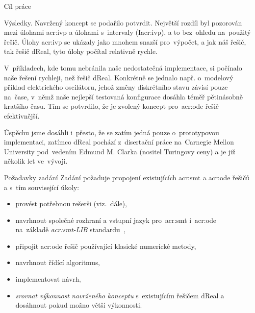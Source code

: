 \documentclass[thesis=M,czech]{FITthesis}[2012/06/26]
\newcommand{\acrlabel}[1]{acr:#1}
\newcommand{\acr}[1]{\acrshort{\acrlabel{#1}}}
\newcommand{\hl}[1]{\textit{#1}}
\newcommand{\name}[1]{\hl{#1}}
\newcommand{\cit}[1]{\cite{#1}}
\begin{document}
\begin{introduction}
\begin{section}{Cíl práce}

\begin{paragraph}{Výsledky.}\label{p:intro:goal:results}
Navržený koncept se podařilo potvrdit.
Největší rozdíl byl pozorován
mezi úlohami \acr{ivp} a úlohami s~intervaly
(I\acr{ivp}), a to bez~ohledu
na~použitý řešič.
Úlohy \acr{ivp} se ukázaly jako mnohem
snazší pro~výpočet,
a jak náš řešič, tak řešič dReal,
tyto úlohy počítal relativně rychle.

V~příkladech, kde tomu nebránila
naše nedostatečná implementace,
si počínalo naše řešení rychleji, než řešič dReal.
Konkrétně se jednalo např. o~modelový příklad
elektrického oscilátoru, jehož změny diskrétního stavu
závisí pouze na~čase,
v~němž naše nejlepší testovaná konfigurace
dosáhla téměř pětinásobně kratšího času.
Tím se potvrdilo,
že je zvolený koncept pro~\acr{ode} řešič efektivnější.

Úspěchu jsme dosáhli i~přesto,
že se zatím jedná pouze o~prototypovou implementaci,
zatímco dReal pochází z~disertační práce
na~Carnegie Mellon University
pod~vedením Edmund M. Clarka (nositel Turingovy ceny)
a je již několik let ve~vývoji.
\end{paragraph} %


\end{section} %


\begin{section}{Požadavky zadání}\label{s:intro:req}
Zadání požaduje propojení existujících \acr{smt} a \acr{ode} řešičů
a s~tím související úkoly:
\begin{itemize}
\item provést potřebnou rešerši (viz.~dále),
\item navrhnout společné rozhraní
   a vstupní jazyk pro~\acr{smt} i~\acr{ode}
   na~základě \name{\acr{smt}-LIB} standardu~\cit{smtlib},
\item připojit \acr{ode} řešič používající klasické numerické metody,
\item navrhnout řídící algoritmus,
\item implementovat návrh,
\item \hl{srovnat výkonnost navrženého konceptu}
   s~existujícím řešičem dReal a dosáhnout pokud možno větší výkonnosti.
\end{itemize}



\end{section}
\end{introduction}
\end{document}
